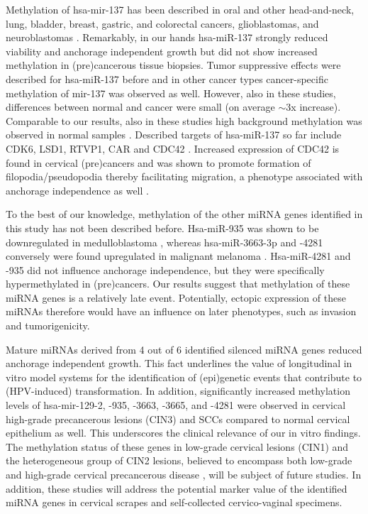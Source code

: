 Methylation of hsa-mir-137 has been described in oral and other head-and-neck, lung, bladder, breast, gastric, and colorectal cancers, glioblastomas, and neuroblastomas \cite{Bandres2009, Balaguer2010, Bier2013, Chen2011, Du2012, Kozaki2008, Langevin2010, Langevin2011, Shimizu2013, Steponaitiene2015, Takwi2014, Vrba2013, Wiklund2011}.  Remarkably, in our hands hsa-miR-137 strongly reduced viability and anchorage independent growth but did not show increased methylation in (pre)cancerous tissue biopsies. Tumor suppressive effects were described for hsa-miR-137 before \cite{Balaguer2010, Kozaki2008} and in other cancer types cancer-specific methylation of mir-137 was observed as well. However, also in these studies, differences between normal and cancer were small (on average $\sim$3x increase). Comparable to our results, also in these studies high background methylation was observed in normal samples \cite{Balaguer2010, Steponaitiene2015, Wiklund2011}. Described targets of hsa-miR-137 so far include CDK6, LSD1, RTVP1, CAR and CDC42 \cite{Balaguer2010, Bier2013, Kozaki2008, Takwi2014, Silber2008, Zhu2013}. Increased expression of CDC42 is found in cervical (pre)cancers and was shown to promote formation of filopodia/pseudopodia thereby facilitating migration, a phenotype associated with anchorage independence as well \cite{Ruiz2015, Ye2015}. 

To the best of our knowledge, methylation of the other miRNA genes identified in this study has not been described before. Hsa-miR-935 was shown to be downregulated in medulloblastoma \cite{Genovesi2011}, whereas hsa-miR-3663-3p and -4281 conversely were found upregulated in malignant melanoma \cite{Sand2013}. Hsa-miR-4281 and -935 did not influence anchorage independence, but they were specifically hypermethylated in (pre)cancers. Our results suggest that methylation of these miRNA genes is a relatively late event. Potentially, ectopic expression of these miRNAs therefore would have an influence on later phenotypes, such as invasion and tumorigenicity.   

Mature miRNAs derived from 4 out of 6 identified silenced miRNA genes reduced anchorage independent growth. This fact underlines the value of longitudinal in vitro model systems for the identification of (epi)genetic events that contribute to (HPV-induced) transformation. In addition, significantly increased methylation levels of hsa-mir-129-2, -935, -3663, -3665, and -4281 were observed in cervical high-grade precancerous lesions (CIN3) and SCCs compared to normal cervical epithelium as well. This underscores the clinical relevance of our in vitro findings. The methylation status of these genes in low-grade cervical lesions (CIN1) and the heterogeneous group of CIN2 lesions, believed to encompass both low-grade and high-grade cervical precancerous disease \cite{Wilting2016}, will be subject of future studies. In addition, these studies will address the potential marker value of the identified miRNA genes in cervical scrapes and self-collected cervico-vaginal specimens.   

